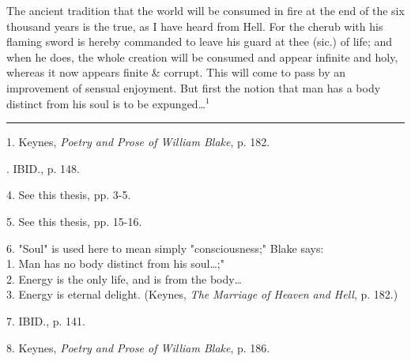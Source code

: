 \begin{center}
	\parbox{0.8\textwidth}{
		\hspace*{5mm}The ancient tradition that the world will be consumed in fire at the end of the six thousand years is the true,
		as I have heard from Hell. For the cherub with his flaming sword is hereby commanded to leave his guard at thee (sic.) of life;
		and when he does, the whole creation will be consumed and appear infinite and holy, whereas it now appears
		finite \& corrupt. This will come to pass by an improvement of sensual enjoyment.
		But first the notion that man has a body distinct from his soul is to be expunged\dots$^{1}$
	}%
\end{center}
\vspace*{\fill}
\noindent\rule{0.25\textwidth}{0.4pt}\par
1. Keynes, \textit{Poetry and Prose of William Blake}, p. 182.\par
[2, 3]. IBID., p. 148.\par
4. See this thesis, pp. 3-5.\par
5. See this thesis, pp. 15-16.\par
6. "Soul" is used here to mean simply "consciousness;" Blake says:\\1. Man has no body distinct from his soul\dots;"
\\2. Energy is the only life, and is from the body\dots\\3. Energy is eternal delight. (Keynes, \textit{The Marriage of Heaven and Hell}, p. 182.)\par
7. IBID., p. 141.\par
8. Keynes, \textit{Poetry and Prose of William Blake}, p. 186.\par

\newpage

{}

